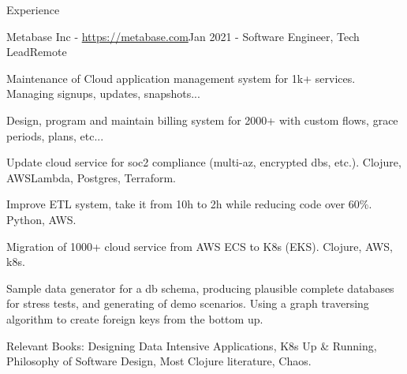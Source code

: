 \documentclass{resume} %
\begin{document}
\begin{rSection}{Experience}
  \begin{rSubsection}{Metabase Inc - \url{https://metabase.com}}{Jan 2021 - }{Software Engineer, Tech Lead}{Remote}
  \item Maintenance of Cloud application management system for 1k+
	  services. Managing signups, updates, snapshots...
  \item Design, program and maintain billing system for 2000+ with custom flows,
	  grace periods, plans, etc...
  \item Update cloud service for soc2 compliance (multi-az, encrypted dbs,
	  etc.). Clojure, AWSLambda, Postgres, Terraform.
  \item Improve ETL system, take it from 10h to 2h while reducing code over
	  60\%. Python, AWS.
  \item Migration of 1000+ cloud service from AWS ECS to K8s (EKS). Clojure, AWS,
	  k8s.
  \item Sample data generator for a db schema, producing plausible complete
	  databases for stress tests, and generating of demo scenarios. Using a
	  graph traversing algorithm to create foreign keys from the bottom up.
  \item Relevant Books: Designing Data Intensive Applications, K8s Up \&
	  Running, Philosophy of Software Design, Most Clojure literature, Chaos.
  \end{rSubsection}


\end{rSection}
\end{document}
